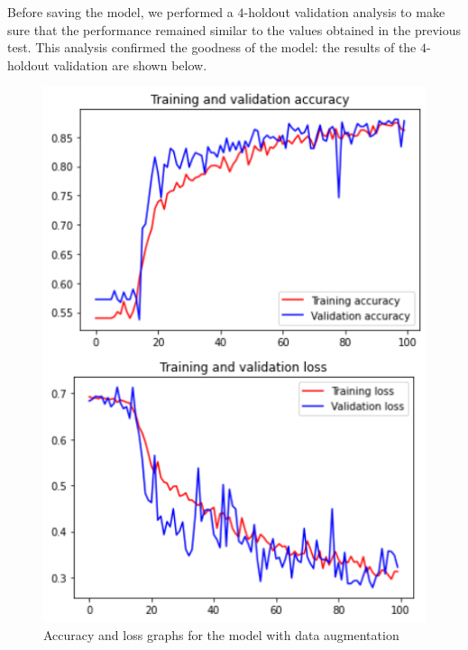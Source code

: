 \documentclass[11pt,a4paper,oneside]{article}
\begin{document}
Before saving the model, we performed a $4$-holdout validation analysis to make sure that the performance remained similar to the values obtained in the previous test. 
This analysis confirmed the goodness of the model: the results of the $4$-holdout validation are shown below.

\clearpage

\begin{figure}[ht]
\centering
	\begin{minipage}[c]{.4\textwidth}
		\centering\setlength{\captionmargin}{0pt}%
		\includegraphics[width=.9\textwidth]{images/2.1-da/da_accuracy}
		\caption{Accuracy and loss graphs for the model with data augmentation}
		\label{fig:scratch_accuracy_da}
	\end{minipage}
	\hspace{5mm}%
	\begin{minipage}[c]{.4\textwidth}
		\centering\setlength{\captionmargin}{0pt}%

\end{minipage}
\end{figure}
\end{document}

